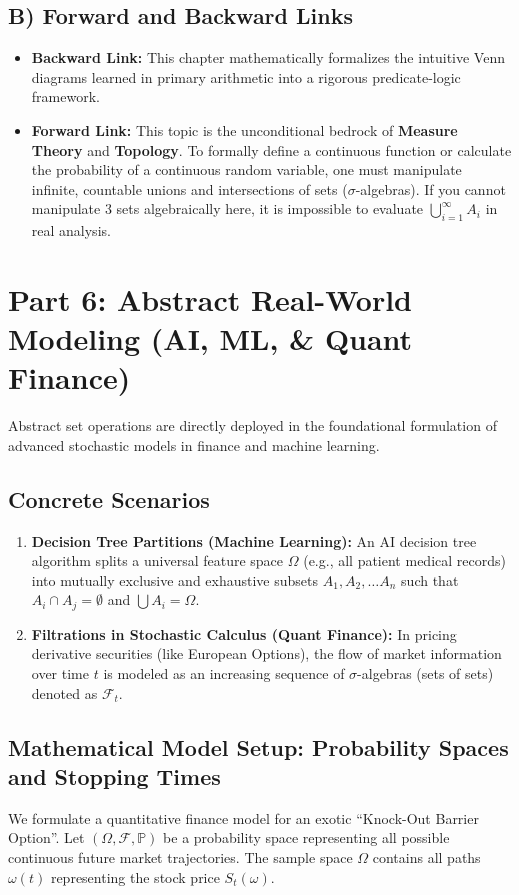 \documentclass[11pt]{article}
\theoremstyle{definition}
\begin{document}
\subsection{B) Forward and Backward Links}
\begin{itemize}
    \item \textbf{Backward Link:} This chapter mathematically formalizes the intuitive Venn diagrams learned in primary arithmetic into a rigorous predicate-logic framework. 
    \item \textbf{Forward Link:} This topic is the unconditional bedrock of \textbf{Measure Theory} and \textbf{Topology}. To formally define a continuous function or calculate the probability of a continuous random variable, one must manipulate infinite, countable unions and intersections of sets ($\sigma$-algebras). If you cannot manipulate 3 sets algebraically here, it is impossible to evaluate $\bigcup_{i=1}^{\infty} A_i$ in real analysis.
\end{itemize}

\section{Part 6: Abstract Real-World Modeling (AI, ML, \& Quant Finance)}

Abstract set operations are directly deployed in the foundational formulation of advanced stochastic models in finance and machine learning.

\subsection{Concrete Scenarios}
\begin{enumerate}
    \item \textbf{Decision Tree Partitions (Machine Learning):} An AI decision tree algorithm splits a universal feature space $\Omega$ (e.g., all patient medical records) into mutually exclusive and exhaustive subsets $A_1, A_2, \dots A_n$ such that $A_i \cap A_j = \emptyset$ and $\bigcup A_i = \Omega$. 
    \item \textbf{Filtrations in Stochastic Calculus (Quant Finance):} In pricing derivative securities (like European Options), the flow of market information over time $t$ is modeled as an increasing sequence of $\sigma$-algebras (sets of sets) denoted as $\mathcal{F}_t$.
\end{enumerate}

\subsection{Mathematical Model Setup: Probability Spaces and Stopping Times}
We formulate a quantitative finance model for an exotic ``Knock-Out Barrier Option''.
Let $(\Omega, \mathcal{F}, \mathbb{P})$ be a probability space representing all possible continuous future market trajectories. The sample space $\Omega$ contains all paths $\omega(t)$ representing the stock price $S_t(\omega)$.
\end{document}
